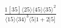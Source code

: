 \documentclass[varwidth, border=5pt]{standalone}
\begin{document}
\begin{my}
$\begin{gathered}
\scriptscriptstyle\frac{1[35]⟨25⟩⟨45⟩⟨35⟩^2}{⟨15⟩⟨34⟩^3⟨5|1+2|5]}
\end{gathered}$
\end{my}
\end{document}
